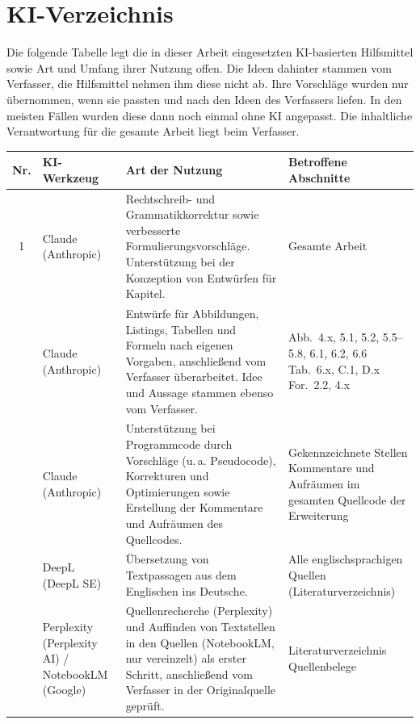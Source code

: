 \chapter*{KI-Verzeichnis}

\noindent Die folgende Tabelle legt die in dieser Arbeit eingesetzten KI-basierten Hilfsmittel sowie Art und Umfang ihrer Nutzung offen. Die Ideen dahinter stammen vom Verfasser, die Hilfsmittel nehmen ihm diese nicht ab. Ihre Vorschläge wurden nur übernommen, wenn sie passten und nach den Ideen des Verfassers liefen. In den meisten Fällen wurden diese dann noch einmal ohne KI angepasst. Die inhaltliche Verantwortung für die gesamte Arbeit liegt beim Verfasser.
\bigskip

\begin{center}
\renewcommand{\arraystretch}{1.35}
\setlength{\tabcolsep}{5pt}
{\small
\begin{tabular}{c >{\raggedright\arraybackslash}p{2.6cm} >{\raggedright\arraybackslash}p{5.6cm} >{\raggedright\arraybackslash}p{3.9cm}}
\toprule
\textbf{Nr.} & \textbf{KI-Werkzeug} & \textbf{Art der Nutzung} & \textbf{Betroffene Abschnitte} \\
\midrule
1 & Claude (Anthropic)
  & Rechtschreib- und Grammatikkorrektur sowie verbesserte Formulierungsvorschläge. Unterstützung bei der Konzeption von Entwürfen für Kapitel.
  & Gesamte Arbeit \\
\addlinespace
2 & Claude (Anthropic)
  & Entwürfe für Abbildungen, Listings, Tabellen und Formeln nach eigenen Vorgaben, anschließend vom Verfasser überarbeitet. Idee und Aussage stammen ebenso vom Verfasser.
  & Abb.~4.x, 5.1, 5.2, 5.5--5.8, 6.1, 6.2, 6.6 \newline Tab.~6.x, C.1, D.x \newline For.~2.2, 4.x \\
\addlinespace
3 & Claude (Anthropic)
  & Unterstützung bei Programmcode durch Vorschläge (u.\,a. Pseudocode), Korrekturen und Optimierungen sowie Erstellung der Kommentare und Aufräumen des Quellcodes.
  & Gekennzeichnete Stellen \newline Kommentare und Aufräumen im gesamten Quellcode der Erweiterung \\
\addlinespace
4 & DeepL (DeepL SE)
  & Übersetzung von Textpassagen aus dem Englischen ins Deutsche.
  & Alle englischsprachigen Quellen (Literaturverzeichnis) \\
\addlinespace
5 & Perplexity (Perplexity AI) / NotebookLM (Google)
  & Quellenrecherche (Perplexity) und Auffinden von Textstellen in den Quellen (NotebookLM, nur vereinzelt) als erster Schritt, anschließend vom Verfasser in der Originalquelle geprüft.
  & Literaturverzeichnis \newline Quellenbelege \\
\bottomrule
\end{tabular}
}
\end{center}
